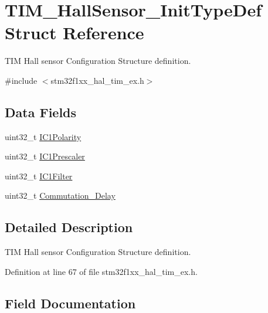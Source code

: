 \hypertarget{struct_t_i_m___hall_sensor___init_type_def}{}\section{T\+I\+M\+\_\+\+Hall\+Sensor\+\_\+\+Init\+Type\+Def Struct Reference}
\label{struct_t_i_m___hall_sensor___init_type_def}


T\+IM Hall sensor Configuration Structure definition.  




{\ttfamily \#include $<$stm32f1xx\+\_\+hal\+\_\+tim\+\_\+ex.\+h$>$}

\subsection*{Data Fields}
\begin{DoxyCompactItemize}
\item 
uint32\+\_\+t \hyperlink{struct_t_i_m___hall_sensor___init_type_def_ac1191c7421a3ca4c53ec7875870812e5}{I\+C1\+Polarity}
\item 
uint32\+\_\+t \hyperlink{struct_t_i_m___hall_sensor___init_type_def_aa913a8df0a4c97fefa87ff760fae10cb}{I\+C1\+Prescaler}
\item 
uint32\+\_\+t \hyperlink{struct_t_i_m___hall_sensor___init_type_def_a5efa2ad5085fe72fb0b5dc2e2fc61def}{I\+C1\+Filter}
\item 
uint32\+\_\+t \hyperlink{struct_t_i_m___hall_sensor___init_type_def_a5d74bf14283eb95439d6d37952274f07}{Commutation\+\_\+\+Delay}
\end{DoxyCompactItemize}


\subsection{Detailed Description}
T\+IM Hall sensor Configuration Structure definition. 

Definition at line 67 of file stm32f1xx\+\_\+hal\+\_\+tim\+\_\+ex.\+h.



\subsection{Field Documentation}
\mbox{\label{struct_t_i_m___hall_sensor___init_type_def_a5d74bf14283eb95439d6d37952274f07}} 
